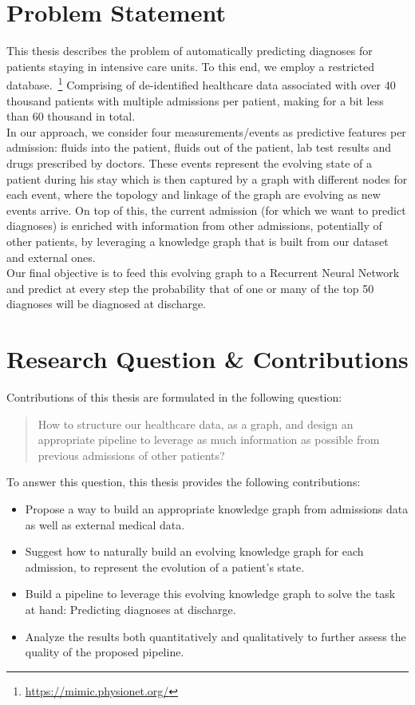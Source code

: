\section{Problem Statement}
\label{sec:Problem Statement}
This thesis describes the problem of automatically predicting diagnoses for patients staying in intensive care units. To this end, we employ a restricted database.~\footnote{\url{https://mimic.physionet.org/}} Comprising of de-identified healthcare data associated with over 40 thousand patients with multiple admissions per patient, making for a bit less than 60 thousand in total. \\

In our approach, we consider four measurements/events as predictive features per admission: fluids into the patient, fluids out of the patient, lab test results and drugs prescribed by doctors. These events represent the evolving state of a patient during his stay which is then captured by a graph with different nodes for each event, where the topology and linkage of the graph are evolving as new events arrive. On top of this, the current admission (for which we want to predict diagnoses) is enriched with information from other admissions, potentially of other patients, by leveraging a knowledge graph that is built from our dataset and external ones. \\

Our final objective is to feed this evolving graph to a Recurrent Neural Network and predict at every step the probability that of one or many of the top 50 diagnoses will be diagnosed at discharge.

\section{Research Question \& Contributions}
\label{sec:Research Question & Contributions}
Contributions of this thesis are formulated in the following question:
\begin{quote}
How to structure our healthcare data, as a graph, and design an appropriate pipeline to leverage as much information as possible from previous admissions of other patients?
\end{quote}
To answer this question, this thesis provides the following contributions:
\begin{itemize}
	\item Propose a way to build an appropriate knowledge graph from admissions data as well as external medical data.
	\item Suggest how to naturally build an evolving knowledge graph for each admission, to represent the evolution of a patient's state.
	\item Build a pipeline to leverage this evolving knowledge graph to solve the task at hand: Predicting diagnoses at discharge.
	\item Analyze the results both quantitatively and qualitatively to further assess the quality of the proposed pipeline.
\end{itemize}
